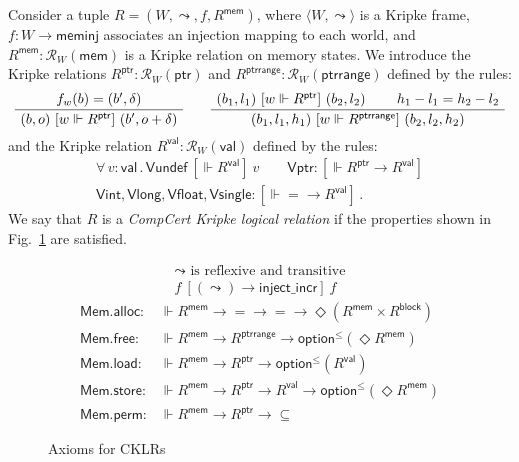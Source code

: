 \documentclass[sigplan,10pt,review,anonymous]{acmart}
\newcommand{\kw}[1]{\ensuremath{ \mathsf{#1} }}
\newcommand{\ifr}[1]{\ [{#1}]\ }
\begin{document}
\begin{definition} \label{def:cklr} %
Consider a tuple $R = (W, \leadsto, f, R^\kw{mem})$,
where
$\langle W, \leadsto \rangle$ is a Kripke frame,
$f : W \rightarrow \kw{meminj}$
associates an injection mapping to each world, and
$R^\kw{mem} : \mathcal{R}_{W}(\kw{mem})$
is a Kripke relation on memory states.
We introduce the Kripke relations
$R^\kw{ptr} : \mathcal{R}_W(\kw{ptr})$ and
$R^\kw{ptrrange} : \mathcal{R}_W(\kw{ptrrange})$
defined by the rules:
\[
  \AxiomC{$f_w(b) = (b', \delta)$}
  \UnaryInfC{$(b, o) \ifr{w \Vdash R^\kw{ptr}} (b', o + \delta)$}
  \DisplayProof
  \qquad
  \AxiomC{$(b_1, l_1) \ifr{w \Vdash R^\kw{ptr}} (b_2, l_2)$}
  \AxiomC{$h_1 - l_1 = h_2 - l_2$}
  \BinaryInfC{$(b_1, l_1, h_1) \ifr{w \Vdash R^\kw{ptrrange}} (b_2, l_2, h_2)$}
  \DisplayProof
\]
and the Kripke relation
$R^\kw{val} : \mathcal{R}_W(\kw{val})$
defined by the rules:
\begin{gather*}
  \forall \, v : \kw{val} \,.\,
    \kw{Vundef} \ifr{\Vdash R^\kw{val}} v \qquad
  \kw{Vptr} : {}
    [\Vdash R^\kw{ptr} \rightarrow R^\kw{val}] \\
  \kw{Vint}, \kw{Vlong}, \kw{Vfloat}, \kw{Vsingle} :
    [\Vdash {=} \rightarrow R^\kw{val}] \,.
\end{gather*}
We say that $R$ is a \emph{CompCert Kripke logical relation}
if the properties shown in Fig.~\ref{fig:cklr-def} are satisfied.
\end{definition}

\begin{figure} %
  \footnotesize
  \begin{gather*}
    {\leadsto} \mbox{ is reflexive and transitive} \\
    f \ifr{(\leadsto) \rightarrow \kw{inject\_incr}} f
  \end{gather*}
  \begin{align*}
      \kw{Mem.alloc} :
        &\Vdash R^\kw{mem} \rightarrow {=} \rightarrow {=} \rightarrow
        \Diamond (R^\kw{mem} \times R^\kw{block})
      \\
      \kw{Mem.free} :
        &\Vdash R^\kw{mem} \rightarrow R^\kw{ptrrange} \rightarrow
        \kw{option}^\le(\Diamond R^\kw{mem})
      \\
      \kw{Mem.load} :
        &\Vdash R^\kw{mem} \rightarrow R^\kw{ptr} \rightarrow
        \kw{option}^\le(R^\kw{val})
      \\
      \kw{Mem.store} :
        &\Vdash R^\kw{mem} \rightarrow R^\kw{ptr} \rightarrow R^\kw{val} \rightarrow
        \kw{option}^\le(\Diamond R^\kw{mem})
      \\
      \kw{Mem.perm} :
        &\Vdash R^\kw{mem} \rightarrow R^\kw{ptr} \rightarrow {\subseteq}
  \end{align*}
  \caption{Axioms for CKLRs}
  \label{fig:cklr-def}
\end{figure}
\end{document}
